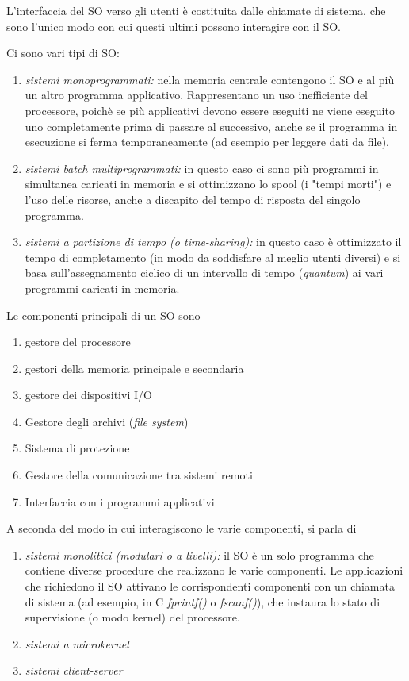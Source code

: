 \documentclass[a4paper,11pt]{article}
\begin{document}
\begin{enumerate}[resume]
	\noindent L'interfaccia del SO verso gli utenti è costituita dalle chiamate di sistema, che sono l'unico modo con cui questi ultimi possono interagire con il SO.
	
	\noindent Ci sono vari tipi di SO:
	\begin{enumerate}
		\item \textit{sistemi monoprogrammati:} nella memoria centrale contengono il SO e al più un altro programma applicativo. Rappresentano un uso inefficiente del processore, poichè se più applicativi devono essere eseguiti ne viene eseguito uno completamente prima di passare al successivo, anche se il programma in esecuzione si ferma temporaneamente (ad esempio per leggere dati da file). 
		\item\textit{sistemi batch multiprogrammati:} in questo caso ci sono più programmi in simultanea caricati in memoria e si ottimizzano lo spool (i "tempi morti") e l'uso delle risorse, anche a discapito del tempo di risposta del singolo programma.
		\item\textit{sistemi a partizione di tempo (o time-sharing):} in questo caso è ottimizzato il tempo di completamento (in modo da soddisfare al meglio utenti diversi) e si basa sull'assegnamento ciclico di un intervallo di tempo (\textit{quantum}) ai vari programmi caricati in memoria.
	\end{enumerate}

	\noindent Le componenti principali di un SO sono
	\begin{enumerate}
		\item gestore del processore
		\item gestori della memoria principale e secondaria
		\item gestore dei dispositivi I/O
		\item Gestore degli archivi (\textit{file system})
		\item Sistema di protezione
		\item Gestore della comunicazione tra sistemi remoti
		\item Interfaccia con i programmi applicativi
	\end{enumerate}
	
	\noindent A seconda del modo in cui interagiscono le varie componenti, si parla di
	\begin{enumerate}
		\item\textit{sistemi monolitici (modulari o a livelli):} il SO è un solo programma che contiene diverse procedure che realizzano le varie componenti. Le applicazioni che richiedono il SO attivano le corrispondenti componenti con un chiamata di sistema (ad esempio, in C \textit{fprintf()} o \textit{fscanf()}), che instaura lo stato di supervisione (o modo kernel) del processore.
		\item\textit{sistemi a microkernel} 
		\item\textit{sistemi client-server} 
	\end{enumerate}


\end{enumerate}
\end{document}
